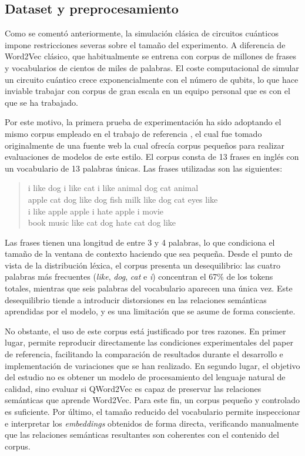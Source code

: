 \subsection{Dataset y preprocesamiento}

Como se comentó anteriormente, la simulación clásica de circuitos cuánticos impone restricciones severas sobre el tamaño del experimento. A diferencia de Word2Vec clásico, que habitualmente se entrena con corpus de millones de frases y vocabularios de cientos de miles de palabras. El coste computacional de simular un circuito cuántico crece exponencialmente con el número de qubits, lo que hace inviable trabajar con corpus de gran escala en un equipo personal que es con el que se ha trabajado.

Por este motivo, la primera prueba de experimentación ha sido adoptando el mismo corpus empleado en el trabajo de referencia \cite{ohno_qword2vec_2025}, el cual fue tomado originalmente de una fuente web la cual ofrecía corpus pequeños para realizar evaluaciones de modelos de este estilo. El corpus consta de 13 frases en inglés con un vocabulario de 13 palabras únicas. Las frases utilizadas son las siguientes:

\begin{quote}
  \ttfamily
  i like dog \quad i like cat \quad i like animal \quad dog cat animal \\
  apple cat dog like \quad dog fish milk like \quad dog cat eyes like \\
  i like apple \quad apple i hate \quad apple i movie \\
  book music like \quad cat dog hate \quad cat dog like
\end{quote}

Las frases tienen una longitud de entre 3 y 4 palabras, lo que condiciona el tamaño de la ventana de contexto haciendo que sea pequeña. Desde el punto de vista de la distribución léxica, el corpus presenta un desequilibrio: las cuatro palabras más frecuentes (\textit{like}, \textit{dog}, \textit{cat} e \textit{i}) concentran el 67\% de los tokens totales, mientras que seis palabras del vocabulario aparecen una única vez. Este desequilibrio tiende a introducir distorsiones en las relaciones semánticas aprendidas por el modelo, y es una limitación que se asume de forma consciente.

No obstante, el uso de este corpus está justificado por tres razones. En primer lugar, permite reproducir directamente las condiciones experimentales del paper de referencia, facilitando la comparación de resultados durante el desarrollo e implementación de variaciones que se han realizado. En segundo lugar, el objetivo del estudio no es obtener un modelo de procesamiento del lenguaje natural de calidad, sino evaluar si QWord2Vec es capaz de preservar las relaciones semánticas que aprende Word2Vec. Para este fin, un corpus pequeño y controlado es suficiente. Por último, el tamaño reducido del vocabulario permite inspeccionar e interpretar los \textit{embeddings} obtenidos de forma directa, verificando manualmente que las relaciones semánticas resultantes son coherentes con el contenido del corpus.

